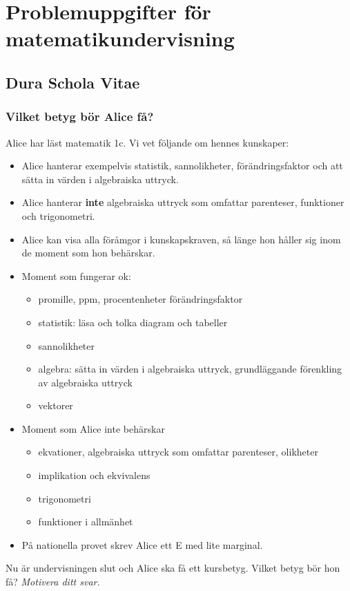 \part*{Problemuppgifter för matematikundervisning}

\chapter{Dura Schola Vitae}

\setcounter{section}{0}
\section{Vilket betyg bör Alice få?}
Alice har läst matematik 1c. Vi vet följande om hennes kunskaper:

\begin{itemize}
  \item Alice hanterar exempelvis statistik, sannolikheter, förändringsfaktor och att sätta in värden i algebraiska uttryck.
  \item Alice hanterar \textbf{inte} algebraiska uttryck som omfattar parenteser, funktioner och trigonometri.
  \item Alice kan visa alla föråmgor i kunskapskraven, så länge hon håller sig inom de moment som hon behärskar.
  \item Moment som fungerar ok:
    \begin{itemize}
      \item promille, ppm, procentenheter förändringsfaktor
      \item statistik: läsa och tolka diagram och tabeller
      \item sannolikheter
      \item algebra: sätta in värden i algebraiska uttryck, grundläggande förenkling av algebraiska uttryck
      \item vektorer
    \end{itemize}
  \item Moment som Alice inte behärskar
    \begin{itemize}
      \item ekvationer, algebraiska uttryck som omfattar parenteser, olikheter
      \item implikation och ekvivalens
      \item trigonometri
      \item funktioner i allmänhet
    \end{itemize}
  \item På nationella provet skrev Alice ett E med lite marginal.
\end{itemize}

\noindent Nu är undervisningen slut och Alice ska få ett kursbetyg. Vilket betyg bör hon få? \em{Motivera ditt svar.}
